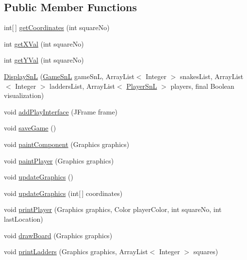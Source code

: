 \subsection*{Public Member Functions}
\begin{DoxyCompactItemize}
\item 
int\mbox{[}$\,$\mbox{]} \hyperlink{class_display_1_1_display_sn_l_a6450a904c441c8fb9023b0f9d7124a3f}{get\+Coordinates} (int square\+No)
\item 
int \hyperlink{class_display_1_1_display_sn_l_aabdde8f61b767f3074b907c65c9ab791}{get\+X\+Val} (int square\+No)
\item 
int \hyperlink{class_display_1_1_display_sn_l_afd3c2bd17e0c216dc962e7c06aa43ad5}{get\+Y\+Val} (int square\+No)
\item 
\hyperlink{class_display_1_1_display_sn_l_a70ac465975e4e58b27ad9de607ab87c6}{Display\+Sn\+L} (\hyperlink{class_game_1_1_game_sn_l}{Game\+Sn\+L} game\+Sn\+L, Array\+List$<$ Integer $>$ snakes\+List, Array\+List$<$ Integer $>$ ladders\+List, Array\+List$<$ \hyperlink{class_player_1_1_player_sn_l}{Player\+Sn\+L} $>$ players, final Boolean visualization)
\item 
void \hyperlink{class_display_1_1_display_sn_l_a8d61f458e61ff504b1cf5305f8bf2d68}{add\+Play\+Interface} (J\+Frame frame)
\item 
void \hyperlink{class_display_1_1_display_sn_l_ad99b932d022788d467c19ccae6cad0f3}{save\+Game} ()
\item 
void \hyperlink{class_display_1_1_display_sn_l_a7b6ce4c6d96203069d610ca54f2d6593}{paint\+Component} (Graphics graphics)
\item 
void \hyperlink{class_display_1_1_display_sn_l_a79258b89d04054d4db7fa10281cb5ff5}{paint\+Player} (Graphics graphics)
\item 
void \hyperlink{class_display_1_1_display_sn_l_a00a9ce1fb1a24a98a1eae6df5ae3f4a4}{update\+Graphics} ()
\item 
void \hyperlink{class_display_1_1_display_sn_l_a401b3176f877da08ac0c40b3ad4d91e4}{update\+Graphics} (int\mbox{[}$\,$\mbox{]} coordinates)
\item 
void \hyperlink{class_display_1_1_display_sn_l_afcacea5e6e612490138e684365ade653}{print\+Player} (Graphics graphics, Color player\+Color, int square\+No, int last\+Location)
\item 
void \hyperlink{class_display_1_1_display_sn_l_a4f41cf7a4a08a86da3fc95d88837eb7b}{draw\+Board} (Graphics graphics)
\item 
void \hyperlink{class_display_1_1_display_sn_l_a8a98e89b9310a140f4df27f2021cec73}{print\+Ladders} (Graphics graphics, Array\+List$<$ Integer $>$ squares)

\end{DoxyCompactItemize}
